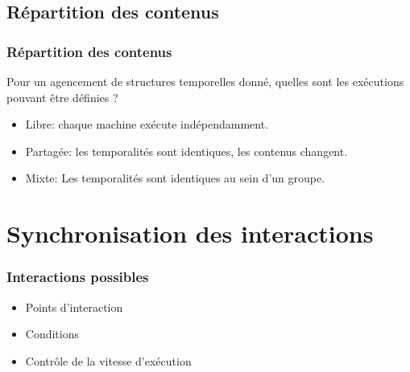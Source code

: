 \documentclass[]{beamer}
\begin{document}
\subsection{Répartition des contenus}
\begin{frame}
\frametitle{Répartition des contenus}
{\Large Pour un agencement de structures temporelles donné, quelles sont les exécutions pouvant être définies ?}

\begin{itemize}
    \item<1> Libre: chaque machine exécute indépendamment.
    \item<1> Partagée: les temporalités sont identiques, les contenus changent.
    \item<1> Mixte: Les temporalités sont identiques au sein d'un groupe.
\end{itemize}
\end{frame}

\section{Synchronisation des interactions}
\begin{frame}
\frametitle{Interactions possibles}
\Large
\begin{itemize}
	\item<1> Points d'interaction
	\item<2> Conditions
	\item<3> Contrôle de la vitesse d'exécution 
\end{itemize}
\end{frame}
\end{document}
